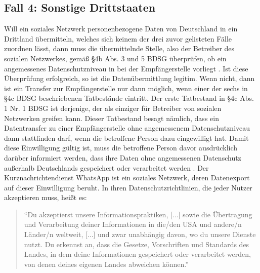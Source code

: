 \subsection{Fall 4: Sonstige Drittstaaten}
Will ein soziales Netzwerk personenbezogene Daten von Deutschland in ein Drittland übermitteln, welches sich keinem der drei zuvor gelisteten Fälle zuordnen lässt, dann muss die übermittelnde Stelle, also der Betreiber des sozialen Netzwerkes, gemäß §4b Abs. 3 und 5 BDSG überprüfen, ob ein angemessenes Datenschutzniveau in bei der Empfängerstelle vorliegt \autocite[vgl.][]{LDI.2017}. Ist diese Überprüfung erfolgreich, so ist die Datenübermittlung legitim. Wenn nicht, dann ist ein Transfer zur Empfängerstelle nur dann möglich, wenn einer der sechs in §4c BDSG beschriebenen Tatbestände eintritt. Der erste Tatbestand in §4c Abs. 1 Nr. 1 BDSG ist derjenige, der als einziger für Betreiber von sozialen Netzwerken greifen kann. Dieser Tatbestand besagt nämlich, dass ein Datentransfer zu einer Empfängerstelle ohne angemessenem Datenschutzniveau dann stattfinden darf, wenn die betroffene Person dazu eingewilligt hat. Damit diese Einwilligung gültig ist, muss die betroffene Person davor ausdrücklich darüber informiert werden, dass ihre Daten ohne angemessenen Datenschutz außerhalb Deutschlands gespeichert oder verarbeitet werden \autocite[vgl.][]{LDI.2017}. Der Kurznachrichtendienst WhatsApp ist ein soziales Netzwerk, deren Datenexport auf dieser Einwilligung beruht. In ihren Datenschutzrichtlinien, die jeder Nutzer akzeptieren muss, heißt es: 
\begin{quotation}
	"`Du akzeptierst unsere Informationspraktiken, [...] sowie die Übertragung und Verarbeitung deiner Informationen in die/den USA und andere/n Länder/n weltweit, [...] und zwar unabhängig davon, wo du unsere Dienste nutzt. Du erkennst an, dass die Gesetze, Vorschriften und Standards des Landes, in dem deine Informationen gespeichert oder verarbeitet werden, von denen deines eigenen Landes abweichen können."' \autocite[][]{WhatsAppInc..2017}
\end{quotation}

